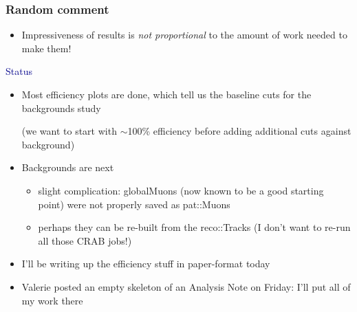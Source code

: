 \documentclass[compress]{beamer}
\begin{document}
\begin{frame}
\frametitle{Random comment}
\begin{itemize}
\item Impressiveness of results is {\it not proportional} to the amount of work needed to make them!
\end{itemize}

\vfill
\hspace{-0.83 cm} \textcolor{darkblue}{\Large Status}
\begin{itemize}
\item Most efficiency plots are done, which tell us the baseline cuts for the backgrounds study

(we want to start with $\sim$100\% efficiency before adding additional cuts against background)

\item Backgrounds are next
\begin{itemize}
\item slight complication: globalMuons (now known to be a good starting point) were not properly saved as pat::Muons
\item perhaps they can be re-built from the reco::Tracks (I don't want to re-run all those CRAB jobs!)
\end{itemize}

\item I'll be writing up the efficiency stuff in paper-format today

\item Valerie posted an empty skeleton of an Analysis Note on Friday: I'll put all of my work there
\end{itemize}
\end{frame}
\end{document}
